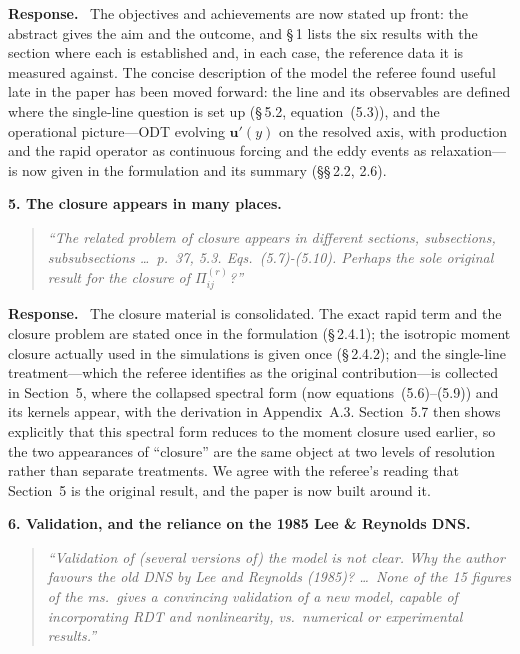 \documentclass[11pt]{article}
\newenvironment{refcomment}%
  {\begin{quote}\color{commentgray}\itshape}%
  {\end{quote}}
\newcommand{\response}{\medskip\noindent\textbf{Response.}\ }
\newcommand{\point}[1]{\bigskip\noindent\textbf{#1}}
\begin{document}
\response
The objectives and achievements are now stated up front: the abstract gives
the aim and the outcome, and \S\,1 lists the six results with the section
where each is established and, in each case, the reference data it is
measured against. The concise description of the model the referee found
useful late in the paper has been moved forward: the line and its
observables are defined where the single-line question is set up (\S\,5.2,
equation~(5.3)), and the operational picture---ODT evolving $\boldsymbol
u'(y)$ on the resolved axis, with production and the rapid operator as
continuous forcing and the eddy events as relaxation---is now given in the
formulation and its summary (\S\S\,2.2, 2.6).

\point{5. The closure appears in many places.}
\begin{refcomment}
``The related problem of closure appears in different sections,
subsections, subsubsections \ldots\ p.\ 37, 5.3. Eqs.\ (5.7)-(5.10).
Perhaps the sole original result for the closure of $\Pi^{(r)}_{ij}$?''
\end{refcomment}

\response
The closure material is consolidated. The exact rapid term and the closure
problem are stated once in the formulation (\S\,2.4.1); the isotropic
moment closure actually used in the simulations is given once (\S\,2.4.2);
and the single-line treatment---which the referee identifies as the
original contribution---is collected in Section~5, where the collapsed
spectral form (now equations~(5.6)--(5.9)) and its kernels appear, with the
derivation in Appendix~A.3. Section~5.7 then shows explicitly that this
spectral form reduces to the moment closure used earlier, so the two
appearances of ``closure'' are the same object at two levels of resolution
rather than separate treatments. We agree with the referee's reading that
Section~5 is the original result, and the paper is now built around it.

\point{6. Validation, and the reliance on the 1985 Lee \& Reynolds DNS.}
\begin{refcomment}
``Validation of (several versions of) the model is not clear. Why the
author favours the old DNS by Lee and Reynolds (1985)? \ldots\ None of the
15 figures of the ms.\ gives a convincing validation of a new model,
capable of incorporating RDT and nonlinearity, vs.\ numerical or
experimental results.''
\end{refcomment}
\end{document}

